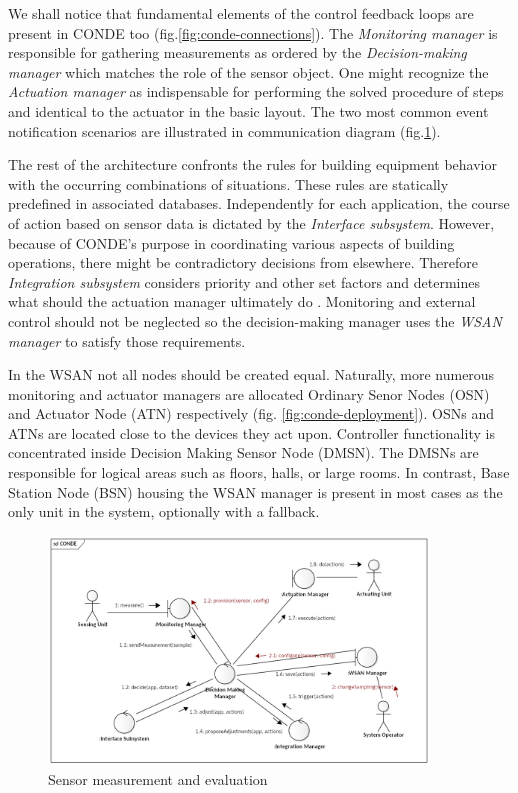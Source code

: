 \documentclass[11pt, english, a4paper, twoside]{article}
\begin{document}
We shall notice that fundamental elements of the control feedback loops are present in CONDE too (fig.\ref{fig:conde-connections}). The \emph{Monitoring manager} is responsible for gathering measurements as ordered by the \emph{Decision-making manager} which matches the role of the sensor object. One might recognize the \emph{Actuation manager} as indispensable for performing the solved procedure of steps and identical to the actuator in the basic layout. The two most common event notification scenarios are illustrated in communication diagram (fig.\ref{fig:conde-communication}). 

The rest of the architecture confronts the rules for building equipment behavior with the occurring combinations of situations. These rules are statically predefined in associated databases. Independently for each application, the course of action based on sensor data is dictated by the \emph{Interface subsystem}. However, because of CONDE's purpose in coordinating various aspects of building operations, there might be contradictory decisions from elsewhere. Therefore \emph{Integration subsystem} considers priority and other set factors and determines what should the actuation manager ultimately do \cite{farias_control_2013}. Monitoring and external control should not be neglected so the decision-making manager uses the \emph{WSAN manager} to satisfy those requirements.

In the WSAN not all nodes should be created equal. Naturally, more numerous monitoring and actuator managers are allocated Ordinary Senor Nodes (OSN) and Actuator Node (ATN) respectively (fig. \ref{fig:conde-deployment}). OSNs and ATNs are located close to the devices they act upon. Controller functionality is concentrated inside Decision Making Sensor Node (DMSN). The DMSNs are responsible for logical areas such as floors, halls, or large rooms. In contrast, Base Station Node (BSN) housing the WSAN manager is present in most cases as the only unit in the system, optionally with a fallback.

\begin{figure}
	\centering
	\includegraphics[width=0.9\textwidth]{CONDE-communication.png}
	\caption{Sensor measurement and evaluation}
	\label{fig:conde-communication}
\end{figure}
\end{document}
